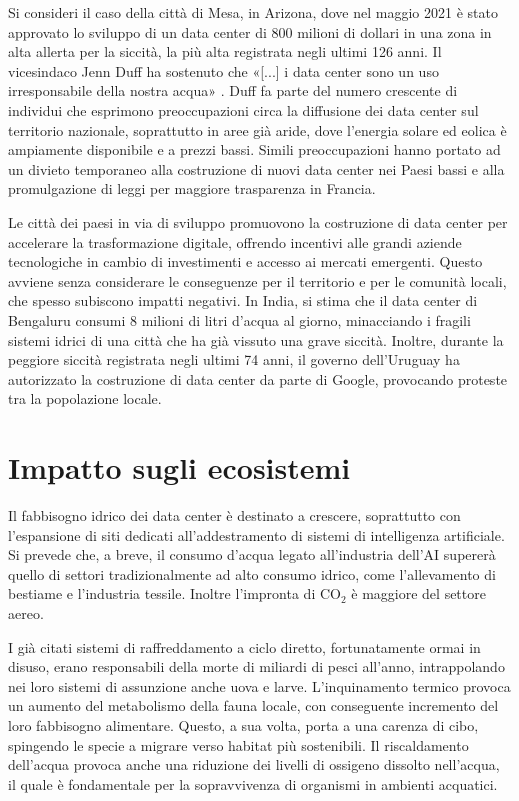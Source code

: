 \documentclass[12pt,a4paper,oneside]{book}
\begin{document}
Si consideri il caso della città di Mesa, in Arizona, dove nel maggio 2021 è stato approvato lo sviluppo di un data center di 800 milioni di dollari in una zona in alta allerta per la siccità, la più alta registrata negli ultimi 126 anni. Il vicesindaco Jenn Duff ha sostenuto che «[...] i data center sono un uso irresponsabile della nostra acqua» \cite{nbc2021drought}. Duff fa parte del numero crescente di individui che esprimono preoccupazioni circa la diffusione dei data center sul territorio nazionale, soprattutto in aree già aride, dove l'energia solare ed eolica è ampiamente disponibile e a prezzi bassi. 
Simili preoccupazioni hanno portato ad un divieto temporaneo alla costruzione di nuovi data center nei Paesi bassi e alla promulgazione di leggi per maggiore trasparenza in Francia.

Le città dei paesi in via di sviluppo promuovono la costruzione di data center per accelerare la trasformazione digitale, offrendo incentivi alle grandi aziende tecnologiche in cambio di investimenti e accesso ai mercati emergenti. Questo avviene senza considerare le conseguenze per il territorio e per le comunità locali, che spesso subiscono impatti negativi.
In India, si stima che il data center di Bengaluru consumi 8 milioni di litri d'acqua al giorno, minacciando i fragili sistemi idrici di una città che ha già vissuto una grave siccità.
Inoltre, durante la peggiore siccità registrata negli ultimi 74 anni, il governo dell'Uruguay ha autorizzato la costruzione di data center da parte di Google, provocando proteste tra la popolazione locale.

\section{Impatto sugli ecosistemi}
Il fabbisogno idrico dei data center è destinato a crescere, soprattutto con l'espansione di siti dedicati all'addestramento di sistemi di intelligenza artificiale. Si prevede che, a breve, il consumo d'acqua legato all'industria dell'AI supererà quello di settori tradizionalmente ad alto consumo idrico, come l'allevamento di bestiame e l'industria tessile. Inoltre l'impronta di CO$_2$ è maggiore del settore aereo.

I già citati sistemi di raffreddamento a ciclo diretto, fortunatamente ormai in disuso, erano responsabili della morte di miliardi di pesci all'anno, intrappolando nei loro sistemi di assunzione anche uova e larve. L'inquinamento termico provoca un aumento del metabolismo della fauna locale, con conseguente incremento del loro fabbisogno alimentare. Questo, a sua volta, porta a una carenza di cibo, spingendo le specie a migrare verso habitat più sostenibili. Il riscaldamento dell'acqua provoca anche una riduzione dei livelli di ossigeno dissolto nell'acqua, il quale è fondamentale per la sopravvivenza di organismi in ambienti acquatici.
\end{document}
